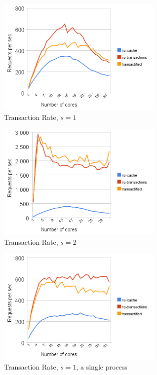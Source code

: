 \documentclass[preprint,natbib,11pt]{sigplanconf}
\begin{document}
\begin{figure}
 \begin{center}
  \includegraphics[width=8cm]{transaction-rate-client-server-1.png}
 \end{center}
 \caption{Transaction Rate, $s = 1$}
 \label{fig:transaction-rate-1}
\end{figure}
\begin{figure}
 \begin{center}
  \includegraphics[width=8cm]{transaction-rate-client-server-2.png}
 \end{center}
 \caption{Transaction Rate, $s = 2$}
 \label{fig:transaction-rate-2}
\end{figure}
\begin{figure}
 \begin{center}
  \includegraphics[width=8cm]{transaction-rate-single-process.png}
 \end{center}
 \caption{Transaction Rate, $s = 1$, a single process}
 \label{fig:one-process-transaction-rate}
\end{figure}
\end{document}
